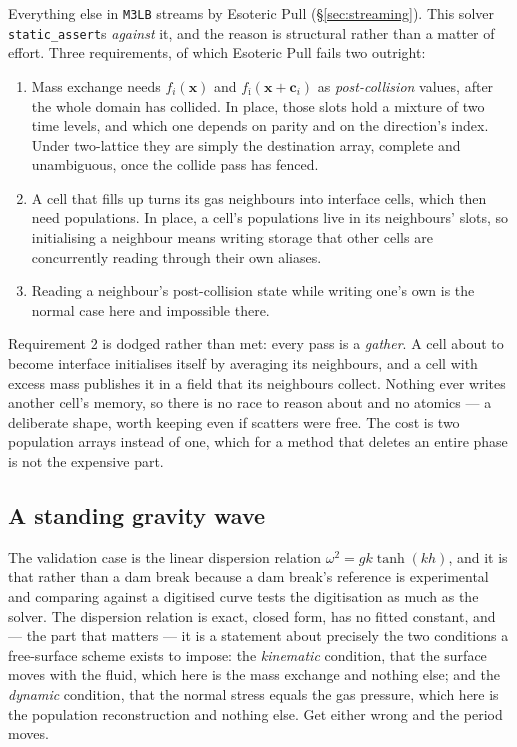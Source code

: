 \documentclass[11pt,a4paper]{article}
\newcommand{\code}[1]{\texttt{\small #1}}
\newcommand{\ci}{\bm{c}_i}
\newcommand{\xx}{\bm{x}}
\begin{document}
Everything else in \code{M3LB} streams by Esoteric Pull (\S\ref{sec:streaming}).
This solver \code{static\_assert}s \emph{against} it, and the reason is
structural rather than a matter of effort. Three requirements, of which Esoteric
Pull fails two outright:

\begin{enumerate}[leftmargin=1.5em,itemsep=2pt]
\item Mass exchange needs $f_i(\xx)$ and $f_{\bar\imath}(\xx+\ci)$ as
  \emph{post-collision} values, after the whole domain has collided. In place,
  those slots hold a mixture of two time levels, and which one depends on parity
  and on the direction's index. Under two-lattice they are simply the
  destination array, complete and unambiguous, once the collide pass has fenced.
\item A cell that fills up turns its gas neighbours into interface cells, which
  then need populations. In place, a cell's populations live in its neighbours'
  slots, so initialising a neighbour means writing storage that other cells are
  concurrently reading through their own aliases.
\item Reading a neighbour's post-collision state while writing one's own is the
  normal case here and impossible there.
\end{enumerate}

Requirement 2 is dodged rather than met: every pass is a \emph{gather}. A cell
about to become interface initialises itself by averaging its neighbours, and a
cell with excess mass publishes it in a field that its neighbours collect.
Nothing ever writes another cell's memory, so there is no race to reason about
and no atomics --- a deliberate shape, worth keeping even if scatters were free.
The cost is two population arrays instead of one, which for a method that
deletes an entire phase is not the expensive part.

\subsection{A standing gravity wave}
\label{sec:gravitywave}

The validation case is the linear dispersion relation
$\omega^2 = g k \tanh(k h)$, and it is that rather than a dam break because a
dam break's reference is experimental and comparing against a digitised curve
tests the digitisation as much as the solver. The dispersion relation is exact,
closed form, has no fitted constant, and --- the part that matters --- it is a
statement about precisely the two conditions a free-surface scheme exists to
impose: the \emph{kinematic} condition, that the surface moves with the fluid,
which here is the mass exchange and nothing else; and the \emph{dynamic}
condition, that the normal stress equals the gas pressure, which here is the
population reconstruction and nothing else. Get either wrong and the period
moves.
\end{document}

